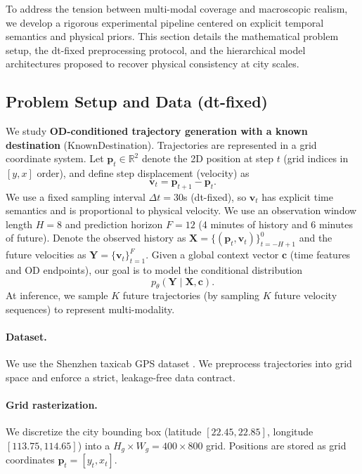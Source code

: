 To address the tension between multi-modal coverage and macroscopic realism, we develop a rigorous experimental pipeline centered on explicit temporal semantics and physical priors. This section details the mathematical problem setup, the dt-fixed preprocessing protocol, and the hierarchical model architectures proposed to recover physical consistency at city scales.

\subsection{Problem Setup and Data (dt-fixed)}
We study \textbf{OD-conditioned trajectory generation with a known destination} (KnownDestination). Trajectories are represented in a grid coordinate system. Let $\mathbf{p}_t \in \mathbb{R}^2$ denote the 2D position at step $t$ (grid indices in $[y,x]$ order), and define step displacement (velocity) as
\begin{equation}
  \mathbf{v}_t = \mathbf{p}_{t+1} - \mathbf{p}_t .
  \label{eq:vel_def}
\end{equation}
We use a fixed sampling interval $\Delta t = 30$s (dt-fixed), so $\mathbf{v}_t$ has explicit time semantics and is proportional to physical velocity.
We use an observation window length $H=8$ and prediction horizon $F=12$ (4 minutes of history and 6 minutes of future). Denote the observed history as $\mathbf{X}=\{(\mathbf{p}_t,\mathbf{v}_t)\}_{t=-H+1}^{0}$ and the future velocities as $\mathbf{Y}=\{\mathbf{v}_t\}_{t=1}^{F}$.
Given a global context vector $\mathbf{c}$ (time features and OD endpoints), our goal is to model the conditional distribution
\begin{equation}
  p_\theta(\mathbf{Y}\mid \mathbf{X}, \mathbf{c}).
  \label{eq:cond_dist}
\end{equation}
At inference, we sample $K$ future trajectories (by sampling $K$ future velocity sequences) to represent multi-modality.

\paragraph{Dataset.}
We use the Shenzhen taxicab GPS dataset \citep{zhang2015urbancps}. We preprocess trajectories into grid space and enforce a strict, leakage-free data contract.

\paragraph{Grid rasterization.}
We discretize the city bounding box (latitude $[22.45, 22.85]$, longitude $[113.75, 114.65]$) into a $H_g \times W_g = 400 \times 800$ grid. Positions are stored as grid coordinates $\mathbf{p}_t=[y_t,x_t]$.

